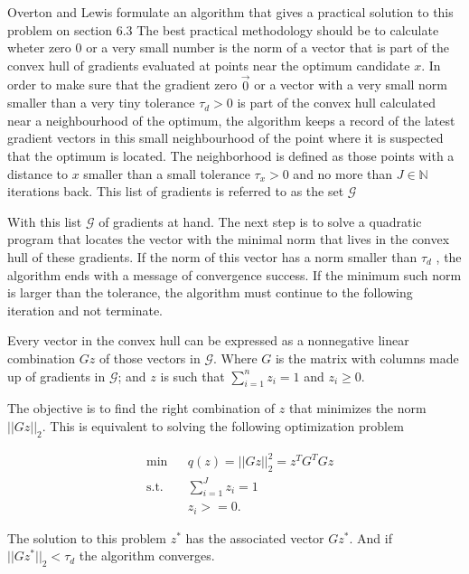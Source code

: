 Overton and Lewis formulate an algorithm that gives a practical solution to this problem on section $6.3$ \citep{overtonlewis}
The best practical methodology should be to calculate wheter zero $0$ or a very small number is the norm of a vector that is part of the convex hull of gradients evaluated at points near the optimum candidate $x$. In order to make sure that the gradient zero $\vec{0}$ or a vector with a very small norm smaller than a very tiny tolerance $\tau_d > 0$ is part of the convex hull calculated near a neighbourhood of the optimum, the algorithm  keeps a record of the latest gradient vectors in this small neighbourhood of the point where it is suspected that the optimum is located. The neighborhood is defined as those points with a distance to $x$ smaller than a small tolerance $\tau_x > 0$ and no more than $J \in \mathbb{N}$ iterations back.  This list of gradients is referred to as the set $\mathcal{G}$ \citep{overtonlewis}

With this list $\mathcal{G}$ of gradients at hand. The next step is to solve a quadratic program that locates the vector with the minimal norm that lives in the convex hull of these gradients.  If the norm of this vector has a norm smaller than $\tau_d$ , the algorithm ends with a message of convergence success. If the minimum such norm is larger than the tolerance, the algorithm must continue to the following iteration and not terminate.

Every vector in the convex hull can be expressed as a nonnegative linear combination $Gz$ of those vectors in $\mathcal{G}$. Where $G$ is the matrix with columns made up of gradients in $\mathcal{G}$; and $z$ is such that $\sum_{i=1}^n z_i = 1$ and $z_i \geq 0$.

The objective is to find the right combination of $z$ that minimizes the norm $||Gz||_2$.  This is equivalent to solving the following optimization problem

\begin{equation} \label{quadraticproblem}
  \begin{aligned}
    & {\text{min}}
    & & q(z) = ||G z ||_2^2 = z^TG^TGz  \\
    & \text{s.t.}
    & & \sum_{i = 1} ^J z_i = 1 \; \\
    & & & z_i >= 0.
  \end{aligned}
\end{equation}

The solution to this problem $z^*$ has the associated vector $Gz^*$. And if $||Gz^*||_2 < \tau_d$ the algorithm converges.

